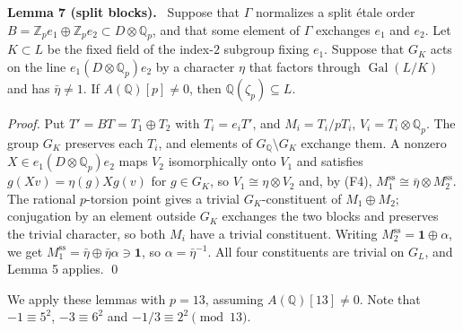 \documentclass[11pt]{article}
\newenvironment{statement}[1]{\par\medskip\noindent\phantomsection\textbf{#1}\ }{\par\medskip}
\newcommand{\Q}{\mathbb Q}
\newcommand{\Z}{\mathbb Z}
\DeclareMathOperator{\Gal}{Gal}
\begin{document}
\begin{statement}{Lemma 7 (split blocks).}\label{lemma-c}
Suppose that \(\Gamma\) normalizes a split étale order \(B=\Z_pe_1\oplus\Z_pe_2\subset D\otimes\Q_p\),
          and that some element of \(\Gamma\) exchanges \(e_1\) and \(e_2\). Let \(K\subset L\) be the fixed field
          of the index-\(2\) subgroup fixing \(e_1\). Suppose that \(G_K\) acts on the line
          \(e_1(D\otimes\Q_p)e_2\) by a character \(\eta\) that factors through \(\Gal(L/K)\) and has
          \(\bar\eta\neq1\). If \(A(\Q)[p]\neq0\), then \(\Q(\zeta_p)\subseteq L\).
\end{statement}

\emph{Proof.} Put \(T'=BT=T_1\oplus T_2\) with \(T_i=e_iT'\), and \(M_i=T_i/pT_i\), \(V_i=T_i\otimes\Q_p\).
      The group \(G_K\) preserves each \(T_i\), and elements of \(G_{\Q}\setminus G_K\) exchange them. A
      nonzero \(X\in e_1(D\otimes\Q_p)e_2\) maps \(V_2\) isomorphically onto \(V_1\) and satisfies
      \(g(Xv)=\eta(g)Xg(v)\) for \(g\in G_K\), so \(V_1\cong\eta\otimes V_2\) and, by (F4),
      \(M_1^{\mathrm{ss}}\cong\bar\eta\otimes M_2^{\mathrm{ss}}\). The rational \(p\)-torsion point gives a trivial
      \(G_K\)-constituent of \(M_1\oplus M_2\); conjugation by an element outside \(G_K\) exchanges the two
      blocks and preserves the trivial character, so both \(M_i\) have a trivial constituent. Writing
      \(M_2^{\mathrm{ss}}=\mathbf 1\oplus\alpha\), we get \(M_1^{\mathrm{ss}}=\bar\eta\oplus\bar\eta\alpha\ni\mathbf 1\),
      so \(\alpha=\bar\eta^{-1}\). All four constituents are trivial on \(G_L\), and Lemma 5 applies. \qed

We apply these lemmas with \(p=13\), assuming \(A(\Q)[13]\neq0\). Note that \(-1\equiv5^2\),
      \(-3\equiv6^2\) and \(-1/3\equiv2^2\pmod{13}\).
\end{document}
